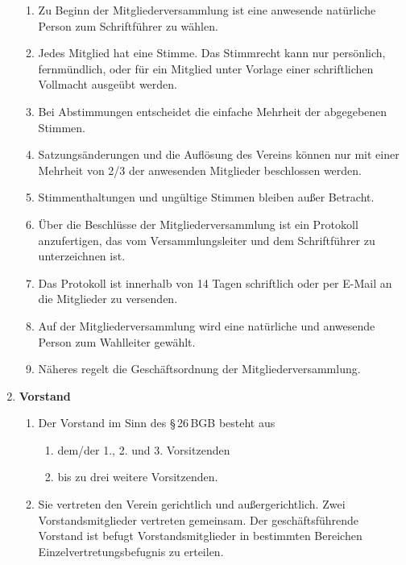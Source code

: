 \documentclass[german]{article}
\newcommand{\paragr}[1]{\item \textsf{\textbf{#1}}}
\begin{document}
\begin{enumerate}
\begin{enumerate}
\item Zu Beginn der Mitgliederversammlung ist eine anwesende natürliche Person zum Schriftführer zu wählen.

\item Jedes Mitglied hat eine Stimme. Das Stimmrecht kann nur persönlich, fernmündlich, oder für ein Mitglied unter Vorlage einer schriftlichen Vollmacht ausgeübt werden.

\item Bei Abstimmungen entscheidet die einfache Mehrheit der abgegebenen Stimmen.

\item Satzungsänderungen und die Auflösung des Vereins können nur mit einer Mehrheit von 2/3 der anwesenden Mitglieder beschlossen werden.

\item Stimmenthaltungen und ungültige Stimmen bleiben außer Betracht.

\item Über die Beschlüsse der Mitgliederversammlung ist ein Protokoll anzufertigen, das vom Versammlungsleiter und dem Schriftführer zu unterzeichnen ist.

\item Das Protokoll ist innerhalb von 14 Tagen schriftlich oder per E-Mail an die Mitglieder zu versenden.

\item Auf der Mitgliederversammlung wird eine natürliche und anwesende Person zum Wahlleiter gewählt.

\item Näheres regelt die Geschäftsordnung der Mitgliederversammlung.

\end{enumerate}


\paragr{Vorstand}
\begin{enumerate}

\item Der Vorstand im Sinn des §\,26\,BGB besteht aus
\begin{enumerate}
\item dem/der 1., 2. und 3. Vorsitzenden
\item bis zu drei weitere Vorsitzenden.
\end{enumerate}


\item Sie vertreten den Verein gerichtlich und außergerichtlich.
Zwei Vorstandsmitglieder vertreten gemeinsam. Der geschäftsführende Vorstand ist befugt Vorstandsmitglieder in bestimmten Bereichen Einzelvertretungsbefugnis zu erteilen.


\end{enumerate}
\end{enumerate}
\end{document}
